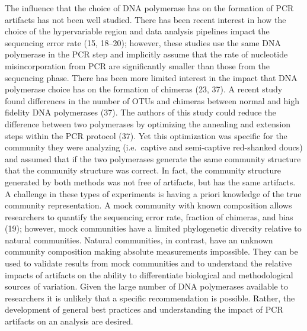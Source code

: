 \documentclass[11pt,]{article}
\begin{document}
The influence that the choice of DNA polymerase has on the formation of
PCR artifacts has not been well studied. There has been recent interest
in how the choice of the hypervariable region and data analysis
pipelines impact the sequencing error rate (15, 18--20); however, these
studies use the same DNA polymerase in the PCR step and implicitly
assume that the rate of nucleotide misincorporation from PCR are
significantly smaller than those from the sequencing phase. There has
been more limited interest in the impact that DNA polymerase choice has
on the formation of chimeras (23, 37). A recent study found differences
in the number of OTUs and chimeras between normal and high fidelity DNA
polymerases (37). The authors of this study could reduce the difference
between two polymerases by optimizing the annealing and extension steps
within the PCR protocol (37). Yet this optimization was specific for the
community they were analyzing (i.e.~captive and semi-captive red-shanked
doucs) and assumed that if the two polymerases generate the same
community structure that the community structure was correct. In fact,
the community structure generated by both methods was not free of
artifacts, but has the same artifacts. A challenge in these types of
experiments is having a priori knowledge of the true community
representation. A mock community with known composition allows
researchers to quantify the sequencing error rate, fraction of chimeras,
and bias (19); however, mock communities have a limited phylogenetic
diversity relative to natural communities. Natural communities, in
contrast, have an unknown community composition making absolute
measurements impossible. They can be used to validate results from mock
communities and to understand the relative impacts of artifacts on the
ability to differentiate biological and methodological sources of
variation. Given the large number of DNA polymerases available to
researchers it is unlikely that a specific recommendation is possible.
Rather, the development of general best practices and understanding the
impact of PCR artifacts on an analysis are desired.
\end{document}
